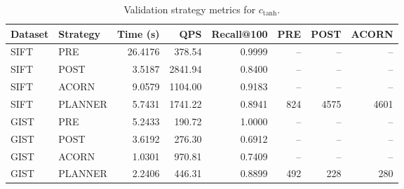 \begin{table}[H]
    \centering
    \renewcommand{\arraystretch}{1.12}
    \begin{tabular}{llrrrrrr}
        \toprule
        Dataset & Strategy & Time (s) & QPS & Recall@100 & PRE & POST & ACORN \\
        \midrule
        SIFT & PRE     & 26.4176 & 378.54  & 0.9999 & --  & --   & --   \\
        SIFT & POST    & 3.5187  & 2841.94 & 0.8400 & --  & --   & --   \\
        SIFT & ACORN   & 9.0579  & 1104.00 & 0.9183 & --  & --   & --   \\
        SIFT & PLANNER & 5.7431  & 1741.22 & 0.8941 & 824 & 4575 & 4601 \\
        \midrule
        GIST & PRE     & 5.2433  & 190.72  & 1.0000 & --  & --  & --  \\
        GIST & POST    & 3.6192  & 276.30  & 0.6912 & --  & --  & --  \\
        GIST & ACORN   & 1.0301  & 970.81  & 0.7409 & --  & --  & --  \\
        GIST & PLANNER & 2.2406  & 446.31  & 0.8899 & 492 & 228 & 280 \\
        \bottomrule
    \end{tabular}
    \caption{Validation strategy metrics for \(c_{\mathrm{tanh}}\).}
    \label{tab:validation-tanh}
\end{table}

\begin{table}[H]
    \centering
    \renewcommand{\arraystretch}{1.12}
    \caption{Planner diagnostics for \(c_{\mathrm{tanh}}\) on the validation sets.}
    \label{tab:validation-tanh-diagnostics}
\end{table}

